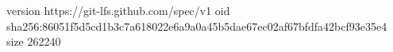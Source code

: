 version https://git-lfs.github.com/spec/v1
oid sha256:86051f5d5cd1b3c7a618022e6a9a0a45b5dae67ec02af67bfdfa42bcf93e35e4
size 262240
